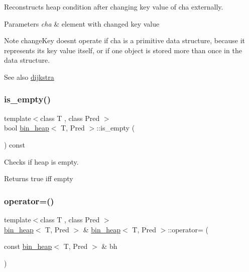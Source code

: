 Reconstructs heap condition after changing key value of {\ttfamily cha} externally. 


\begin{DoxyParams}{Parameters}
{\em cha} & element with changed key value\\
\hline
\end{DoxyParams}
\begin{DoxyNote}{Note}
{\ttfamily change\+Key} doesn\textquotesingle{}t operate if {\ttfamily cha} is a primitive data structure, because it represents its key value itself, or if one object is stored more than once in the data structure.
\end{DoxyNote}
\begin{DoxySeeAlso}{See also}
\mbox{\hyperlink{classdijkstra}{dijkstra}} 
\end{DoxySeeAlso}
\mbox{\label{classbin__heap_a2bbb9cf5cc5cda265c8603c561b796a5}} 
\subsubsection{\texorpdfstring{is\+\_\+empty()}{is\_empty()}}
{\footnotesize\ttfamily template$<$class T , class Pred $>$ \\
bool \mbox{\hyperlink{classbin__heap}{bin\+\_\+heap}}$<$ T, Pred $>$\+::is\+\_\+empty (\begin{DoxyParamCaption}{ }\end{DoxyParamCaption}) const}



Checks if heap is empty. 

\begin{DoxyReturn}{Returns}
{\ttfamily true} iff empty 
\end{DoxyReturn}
\mbox{\label{classbin__heap_ad31b6806316a272686015fcbf5f633cd}} 
\subsubsection{\texorpdfstring{operator=()}{operator=()}}
{\footnotesize\ttfamily template$<$class T , class Pred $>$ \\
\mbox{\hyperlink{classbin__heap}{bin\+\_\+heap}}$<$ T, Pred $>$ \& \mbox{\hyperlink{classbin__heap}{bin\+\_\+heap}}$<$ T, Pred $>$\+::operator= (\begin{DoxyParamCaption}\item[{const \mbox{\hyperlink{classbin__heap}{bin\+\_\+heap}}$<$ T, Pred $>$ \&}]{bh }\end{DoxyParamCaption})}



